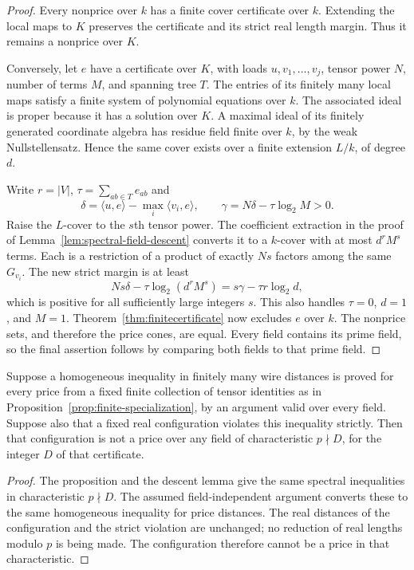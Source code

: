 \begin{proof}
Every nonprice over $k$ has a finite cover certificate over $k$.
Extending the local maps to $K$ preserves the certificate and its
strict real length margin.  Thus it remains a nonprice over $K$.

Conversely, let $e$ have a certificate over $K$, with loads
$u,v_1,\ldots,v_j$, tensor power $N$, number of terms $M$, and
spanning tree $T$.  The entries of its finitely many local maps
satisfy a finite system of polynomial equations over $k$.
The associated ideal is proper because it has a solution over
$K$.  A maximal ideal of its finitely generated coordinate
algebra has residue field finite over $k$, by the weak
Nullstellensatz.  Hence the same cover exists over a finite
extension $L/k$, of degree $d$.

Write $r=|V|$, $\tau=\sum_{ab\in T}e_{ab}$ and
\[
 \delta=\langle u,e\rangle-\max_i\langle v_i,e\rangle,
 \qquad \gamma=N\delta-\tau\log_2 M>0.
\]
Raise the $L$-cover to the $s$th tensor power.  The coefficient
extraction in the proof of
Lemma~\ref{lem:spectral-field-descent} converts it to a $k$-cover
with at most $d^rM^s$ terms.  Each is a restriction of a product
of exactly $Ns$ factors among the same $G_{v_i}$.  The new strict
margin is at least
\[
 Ns\delta-\tau\log_2(d^rM^s)
   =s\gamma-\tau r\log_2d,
\]
which is positive for all sufficiently large integers $s$.
This also handles $\tau=0$, $d=1$, and $M=1$.
Theorem~\ref{thm:finitecertificate} now excludes $e$ over $k$.
The nonprice sets, and therefore the price cones, are equal.
Every field contains its prime field, so the final assertion
follows by comparing both fields to that prime field.
\end{proof}

\begin{corollary}
\label{cor:price-specialization}
Suppose a homogeneous inequality in finitely many wire
distances is proved for every price from a fixed finite
collection of tensor identities as in
Proposition~\ref{prop:finite-specialization}, by an argument
valid over every field.  Suppose also that a fixed real
configuration violates this inequality strictly.  Then
that configuration is not a price over any field of
characteristic $p\nmid D$, for the integer $D$ of that
certificate.
\end{corollary}

\begin{proof}
The proposition and the descent lemma give the same
spectral inequalities in characteristic $p\nmid D$.
The assumed field-independent argument converts these
to the same homogeneous inequality for price distances.
The real distances of the configuration and the strict
violation are unchanged; no reduction of real lengths
modulo $p$ is being made.  The configuration therefore
cannot be a price in that characteristic.
\end{proof}

